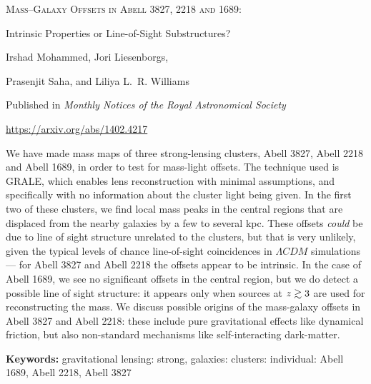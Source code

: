 \documentclass[
  11pt,
  twoside,
  openright,
  titlepage,
  headings=optiontoheadandtoc
]{scrbook}
\begin{document}
\begin{publishedpaper}
  {\fontsize{18}{22}\selectfont\scshape
   Mass--Galaxy Offsets in Abell 3827, 2218 and 1689:\par
   Intrinsic Properties or Line-of-Sight Substructures?\par}

  \vspace{1.25em}

  {\large
   Irshad Mohammed, Jori Liesenborgs,\par
   Prasenjit Saha, and Liliya L.~R. Williams\par}

  \vspace{1.25em}
  {\small
   Published in \textit{Monthly Notices of the Royal Astronomical Society}\par
   \url{https://arxiv.org/abs/1402.4217}\par}
\end{publishedpaper}

\begin{paperabstract}
We have made mass maps of three strong-lensing clusters, Abell 3827,
Abell 2218 and Abell 1689, in order to test for mass-light offsets.
The technique used is GRALE, which enables lens reconstruction with
minimal assumptions, and specifically with no information about the cluster
light being given.  In the first two of these clusters, we find local
mass peaks in the central regions that are displaced from the nearby
galaxies by a few to several kpc.  These offsets {\em could\/} be due
to line of sight structure unrelated to the clusters, but that is very
unlikely, given the typical levels of chance line-of-sight
coincidences in $\Lambda CDM$ simulations --- for Abell 3827 and Abell
2218 the offsets appear to be intrinsic.  In the case of Abell 1689,
we see no significant offsets in the central region, but we do detect
a possible line of sight structure: it appears only when sources at
$z\gtrsim 3$ are used for reconstructing the mass.  We discuss possible
origins of the mass-galaxy offsets in Abell 3827 and Abell 2218: these
include pure gravitational effects like dynamical friction, but also
non-standard mechanisms like self-interacting dark-matter.
\end{paperabstract}


\vspace{1em}
\noindent \textbf{Keywords:} gravitational lensing: strong, galaxies: clusters: individual: Abell 1689, Abell 2218, Abell 3827
\vspace{1em}
\end{document}
